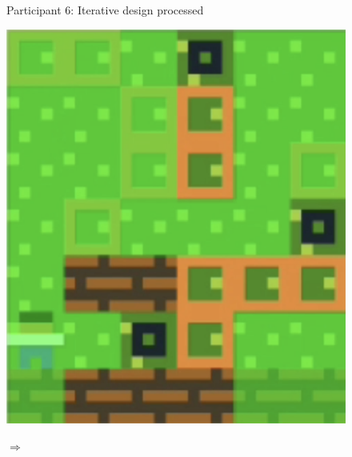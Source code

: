 \begin{figure}[!htbp]
\begin{minipage}[t]{0.2\textwidth}
\end{minipage}
\caption{Participant 6: Iterative design processed \label{fig:part6iterative}}
\end{figure}

\begin{figure}[!htbp]
\centering
\begin{minipage}[t]{0.2\textwidth}
\includegraphics[width=\textwidth]{figures/p8greena.png} \hfill \\
\end{minipage}
$\Longrightarrow$
\begin{minipage}[t]{0.2\textwidth}

\end{minipage}
\end{figure}
